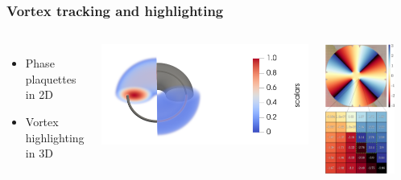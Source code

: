 \documentclass{beamer}
\begin{document}
\begin{frame}
\frametitle{Vortex tracking and highlighting}
\begin{columns}
\begin{itemize}
\item Phase plaquettes in 2D
\item Vortex highlighting in 3D
\end{itemize}
\center \includegraphics[width=1.2\textwidth]{../data/gpu/vortex_highlighting/all.png}

\center \includegraphics[width = 0.8\textwidth]{../data/gpu/vortex_tracking/phi_grid.png}

\end{columns}
\end{frame}
\end{document}
